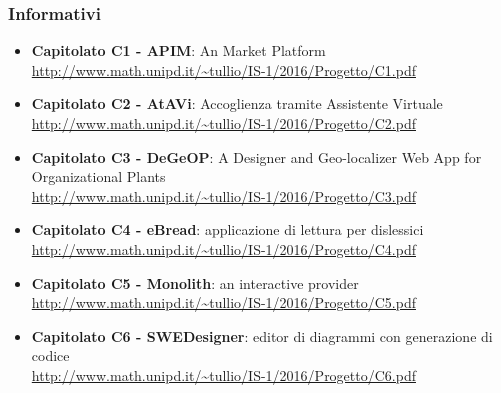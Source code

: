 \subsubsection{Informativi}
\begin{itemize}
	\item \textbf{Capitolato C1 - APIM}: An  Market Platform\\ \url{http://www.math.unipd.it/~tullio/IS-1/2016/Progetto/C1.pdf}
	\item \textbf{Capitolato C2 - AtAVi}: Accoglienza tramite Assistente Virtuale\\
	\url{http://www.math.unipd.it/~tullio/IS-1/2016/Progetto/C2.pdf}
	\item \textbf{Capitolato C3 - DeGeOP}: A Designer and Geo-localizer Web App for Organizational Plants\\ \url{http://www.math.unipd.it/~tullio/IS-1/2016/Progetto/C3.pdf}
	\item \textbf{Capitolato C4 - eBread}: applicazione di lettura per dislessici\\
	\url{http://www.math.unipd.it/~tullio/IS-1/2016/Progetto/C4.pdf}
	\item \textbf{Capitolato C5 - Monolith}: an interactive 
	 provider\\ \url{http://www.math.unipd.it/~tullio/IS-1/2016/Progetto/C5.pdf}
	\item \textbf{Capitolato C6 - SWEDesigner}: editor di diagrammi  con generazione di codice\\ \url{http://www.math.unipd.it/~tullio/IS-1/2016/Progetto/C6.pdf}
\end{itemize}

